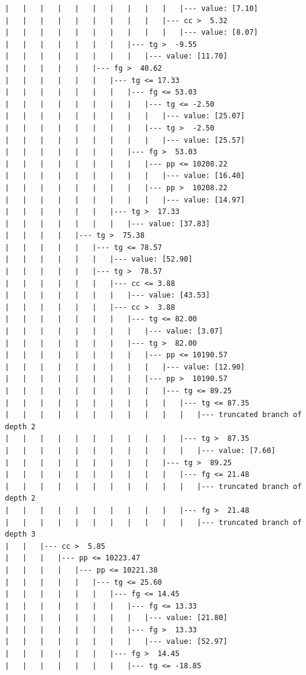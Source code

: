 \documentclass[UTF8, a4paper]{ctexart}
\begin{document}
\begin{lstlisting}
|   |   |   |   |   |   |   |   |   |   |--- value: [7.10]
|   |   |   |   |   |   |   |   |   |--- cc >  5.32
|   |   |   |   |   |   |   |   |   |   |--- value: [8.07]
|   |   |   |   |   |   |   |--- tg >  -9.55
|   |   |   |   |   |   |   |   |--- value: [11.70]
|   |   |   |   |   |--- fg >  40.62
|   |   |   |   |   |   |--- tg <= 17.33
|   |   |   |   |   |   |   |--- fg <= 53.03
|   |   |   |   |   |   |   |   |--- tg <= -2.50
|   |   |   |   |   |   |   |   |   |--- value: [25.07]
|   |   |   |   |   |   |   |   |--- tg >  -2.50
|   |   |   |   |   |   |   |   |   |--- value: [25.57]
|   |   |   |   |   |   |   |--- fg >  53.03
|   |   |   |   |   |   |   |   |--- pp <= 10208.22
|   |   |   |   |   |   |   |   |   |--- value: [16.40]
|   |   |   |   |   |   |   |   |--- pp >  10208.22
|   |   |   |   |   |   |   |   |   |--- value: [14.97]
|   |   |   |   |   |   |--- tg >  17.33
|   |   |   |   |   |   |   |--- value: [37.83]
|   |   |   |   |--- tg >  75.38
|   |   |   |   |   |--- tg <= 78.57
|   |   |   |   |   |   |--- value: [52.90]
|   |   |   |   |   |--- tg >  78.57
|   |   |   |   |   |   |--- cc <= 3.88
|   |   |   |   |   |   |   |--- value: [43.53]
|   |   |   |   |   |   |--- cc >  3.88
|   |   |   |   |   |   |   |--- tg <= 82.00
|   |   |   |   |   |   |   |   |--- value: [3.07]
|   |   |   |   |   |   |   |--- tg >  82.00
|   |   |   |   |   |   |   |   |--- pp <= 10190.57
|   |   |   |   |   |   |   |   |   |--- value: [12.90]
|   |   |   |   |   |   |   |   |--- pp >  10190.57
|   |   |   |   |   |   |   |   |   |--- tg <= 89.25
|   |   |   |   |   |   |   |   |   |   |--- tg <= 87.35
|   |   |   |   |   |   |   |   |   |   |   |--- truncated branch of depth 2
|   |   |   |   |   |   |   |   |   |   |--- tg >  87.35
|   |   |   |   |   |   |   |   |   |   |   |--- value: [7.60]
|   |   |   |   |   |   |   |   |   |--- tg >  89.25
|   |   |   |   |   |   |   |   |   |   |--- fg <= 21.48
|   |   |   |   |   |   |   |   |   |   |   |--- truncated branch of depth 2
|   |   |   |   |   |   |   |   |   |   |--- fg >  21.48
|   |   |   |   |   |   |   |   |   |   |   |--- truncated branch of depth 3
|   |   |--- cc >  5.85
|   |   |   |--- pp <= 10223.47
|   |   |   |   |--- pp <= 10221.38
|   |   |   |   |   |--- tg <= 25.60
|   |   |   |   |   |   |--- fg <= 14.45
|   |   |   |   |   |   |   |--- fg <= 13.33
|   |   |   |   |   |   |   |   |--- value: [21.80]
|   |   |   |   |   |   |   |--- fg >  13.33
|   |   |   |   |   |   |   |   |--- value: [52.97]
|   |   |   |   |   |   |--- fg >  14.45
|   |   |   |   |   |   |   |--- tg <= -18.85

\end{lstlisting}
\end{document}
